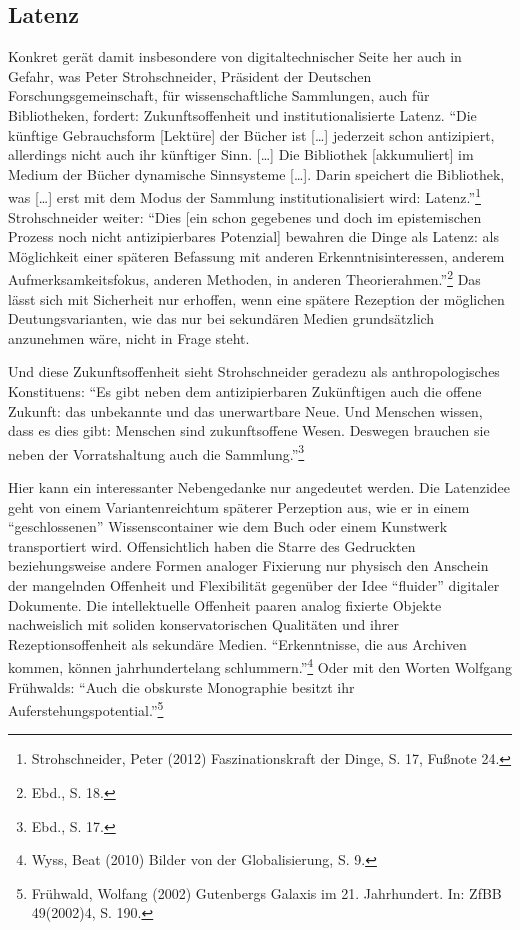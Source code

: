 \documentclass[a4paper,
fontsize=11pt,
oneside,
numbers=noperiodatend,
parskip=half-,
bibliography=totoc,
final
]{scrartcl}
\begin{document}
\subsection*{Latenz}\label{latenz}

Konkret gerät damit insbesondere von digitaltechnischer Seite her auch
in Gefahr, was Peter Strohschneider, Präsident der Deutschen
Forschungsgemeinschaft, für wissenschaftliche Sammlungen, auch für
Bibliotheken, fordert: Zukunftsoffenheit und institutionalisierte
Latenz. \enquote{Die künftige Gebrauchsform {[}Lektüre{]} der Bücher ist
{[}\ldots{}{]} jederzeit schon antizipiert, allerdings nicht auch ihr
künftiger Sinn. {[}\ldots{}{]} Die Bibliothek {[}akkumuliert{]} im
Medium der Bücher dynamische Sinnsysteme {[}\ldots{}{]}. Darin speichert
die Bibliothek, was {[}\ldots{}{]} erst mit dem Modus der Sammlung
institutionalisiert wird: Latenz.}\footnote{Strohschneider, Peter (2012)
  Faszinationskraft der Dinge, S. 17, Fußnote 24.} Strohschneider
weiter: \enquote{Dies {[}ein schon gegebenes und doch im epistemischen
Prozess noch nicht antizipierbares Potenzial{]} bewahren die Dinge als
Latenz: als Möglichkeit einer späteren Befassung mit anderen
Erkenntnisinteressen, anderem Aufmerksamkeitsfokus, anderen Methoden, in
anderen Theorierahmen.}\footnote{Ebd., S. 18.} Das lässt sich mit
Sicherheit nur erhoffen, wenn eine spätere Rezeption der möglichen
Deutungsvarianten, wie das nur bei sekundären Medien grundsätzlich
anzunehmen wäre, nicht in Frage steht.

Und diese Zukunftsoffenheit sieht Strohschneider geradezu als
anthropologisches Konstituens: \enquote{Es gibt neben dem
antizipierbaren Zukünftigen auch die offene Zukunft: das unbekannte und
das unerwartbare Neue. Und Menschen wissen, dass es dies gibt: Menschen
sind zukunftsoffene Wesen. Deswegen brauchen sie neben der
Vorratshaltung auch die Sammlung.}\footnote{Ebd., S. 17.}

Hier kann ein interessanter Nebengedanke nur angedeutet werden. Die
Latenzidee geht von einem Variantenreichtum späterer Perzeption aus, wie
er in einem \enquote{geschlossenen} Wissenscontainer wie dem Buch oder
einem Kunstwerk transportiert wird. Offensichtlich haben die Starre des
Gedruckten beziehungsweise andere Formen analoger Fixierung nur physisch
den Anschein der mangelnden Offenheit und Flexibilität gegenüber der
Idee \enquote{fluider} digitaler Dokumente. Die intellektuelle Offenheit
paaren analog fixierte Objekte nachweislich mit soliden
konservatorischen Qualitäten und ihrer Rezeptionsoffenheit als sekundäre
Medien. \enquote{Erkenntnisse, die aus Archiven kommen, können
jahrhundertelang schlummern.}\footnote{Wyss, Beat (2010) Bilder von der
  Globalisierung, S. 9.} Oder mit den Worten Wolfgang Frühwalds:
\enquote{Auch die obskurste Monographie besitzt ihr
Auferstehungspotential.}\footnote{Frühwald, Wolfang (2002) Gutenbergs
  Galaxis im 21. Jahrhundert. In: ZfBB 49(2002)4, S. 190.}
\end{document}
